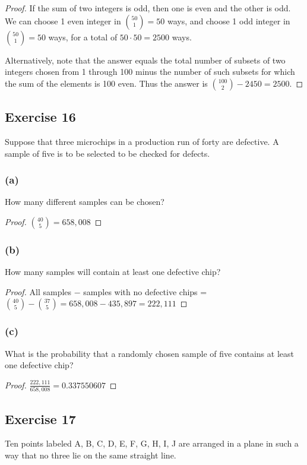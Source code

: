 \documentclass[14pt]{extarticle}
\begin{document}
\begin{proof}
     If the sum of two integers is odd, then one is even and the other is odd. We can choose 1 even integer in \(\binom{50}{1}
     = 50\) ways, and choose 1 odd integer in \(\binom{50}{1} = 50\) ways, for a total of \(50 \cdot 50 = 2500\) ways.

     Alternatively, note that the answer equals the total number of subsets of two integers chosen from 1 through 100 minus the number of such subsets for which the sum of the elements is 100 even. Thus the answer is \(\binom{100}{2} - 2450 = 2500\).
\end{proof}

\subsection{Exercise 16}
Suppose that three microchips in a production run of forty are defective. A sample of five is to be selected to be checked
for defects.

\subsubsection{(a)}
How many different samples can be chosen?

\begin{proof}
     \(\binom{40}{5} = 658,008\)
\end{proof}

\subsubsection{(b)}
How many samples will contain at least one defective chip?

\begin{proof}
     All samples \(-\) samples with no defective chips = \(\binom{40}{5} - \binom{37}{5} = 658,008 - 435,897 = 222,111\)
\end{proof}

\subsubsection{(c)}
What is the probability that a randomly chosen sample of five contains at least one defective chip?

\begin{proof}
     \(\frac{222,111}{658,008} = 0.337550607\)
\end{proof}

\subsection{Exercise 17}
Ten points labeled A, B, C, D, E, F, G, H, I, J are arranged in a plane in such a way that no three lie on the same
straight line.
\end{document}
